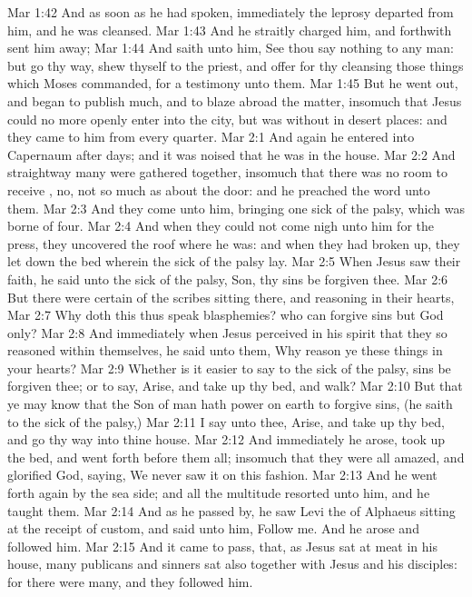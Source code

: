 \vs Mar 1:42 And as soon as he had spoken, immediately the leprosy departed from him, and he was cleansed.
\vs Mar 1:43 And he straitly charged him, and forthwith sent him away;
\vs Mar 1:44 And saith unto him, See thou say nothing to any man: but go thy way, shew thyself to the priest, and offer for thy cleansing those things which Moses commanded, for a testimony unto them.
\vs Mar 1:45 But he went out, and began to publish  much, and to blaze abroad the matter, insomuch that Jesus could no more openly enter into the city, but was without in desert places: and they came to him from every quarter.
\vs Mar 2:1 And again he entered into Capernaum after  days; and it was noised that he was in the house.
\vs Mar 2:2 And straightway many were gathered together, insomuch that there was no room to receive , no, not so much as about the door: and he preached the word unto them.
\vs Mar 2:3 And they come unto him, bringing one sick of the palsy, which was borne of four.
\vs Mar 2:4 And when they could not come nigh unto him for the press, they uncovered the roof where he was: and when they had broken  up, they let down the bed wherein the sick of the palsy lay.
\vs Mar 2:5 When Jesus saw their faith, he said unto the sick of the palsy, Son, thy sins be forgiven thee.
\vs Mar 2:6 But there were certain of the scribes sitting there, and reasoning in their hearts,
\vs Mar 2:7 Why doth this  thus speak blasphemies? who can forgive sins but God only?
\vs Mar 2:8 And immediately when Jesus perceived in his spirit that they so reasoned within themselves, he said unto them, Why reason ye these things in your hearts?
\vs Mar 2:9 Whether is it easier to say to the sick of the palsy,  sins be forgiven thee; or to say, Arise, and take up thy bed, and walk?
\vs Mar 2:10 But that ye may know that the Son of man hath power on earth to forgive sins, (he saith to the sick of the palsy,)
\vs Mar 2:11 I say unto thee, Arise, and take up thy bed, and go thy way into thine house.
\vs Mar 2:12 And immediately he arose, took up the bed, and went forth before them all; insomuch that they were all amazed, and glorified God, saying, We never saw it on this fashion.
\vs Mar 2:13 And he went forth again by the sea side; and all the multitude resorted unto him, and he taught them.
\vs Mar 2:14 And as he passed by, he saw Levi the  of Alphaeus sitting at the receipt of custom, and said unto him, Follow me. And he arose and followed him.
\vs Mar 2:15 And it came to pass, that, as Jesus sat at meat in his house, many publicans and sinners sat also together with Jesus and his disciples: for there were many, and they followed him.
